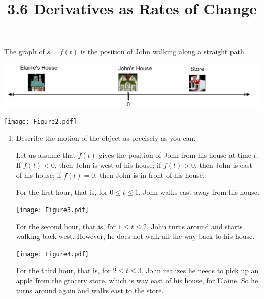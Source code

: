 \documentclass[nooutcomes]{ximera}
\title{3.6 Derivatives as Rates of Change}
\begin{document}
\begin{abstract}		\end{abstract}
\maketitle


\begin{problem}
The graph of $s=f(t)$ is the position of John walking along a straight path.


	\begin{image}
	\includegraphics[scale=.4]{Figure13.png}
	\end{image}

	\begin{image}
	\texttt{[image: Figure2.pdf]}
	\end{image}
	
	\begin{enumerate}
	
	\item  Describe the motion of the object as precisely as you can.
		\begin{freeResponse}
		Let us assume that $f(t)$ gives the position of John from his house at time $t$.  If $f(t) < 0$, then John is west of his house;  if $f(t) > 0$, then John is east of his house; if $f(t)=0$, then John is in front of his house.  
		
		For the first hour, that is, for $0 \leq t \leq 1$, John walks east away from his house.
		
		\begin{image}
		\texttt{[image: Figure3.pdf]}
		\end{image}
	
		For the second hour, that is, for $1 \leq t \leq 2$, John turns around and starts walking back west.  However, he does not walk all the way back to his house.
		
		\begin{image}
		\texttt{[image: Figure4.pdf]}
		\end{image}
		
		For the third hour, that is, for $2\le t\le 3$, John realizes he needs to pick up an apple from the grocery store, which is way east of his house, for Elaine.  So he turns around again and walks east to the store.
		

\end{freeResponse}
\end{enumerate}
\end{problem}
\end{document}
